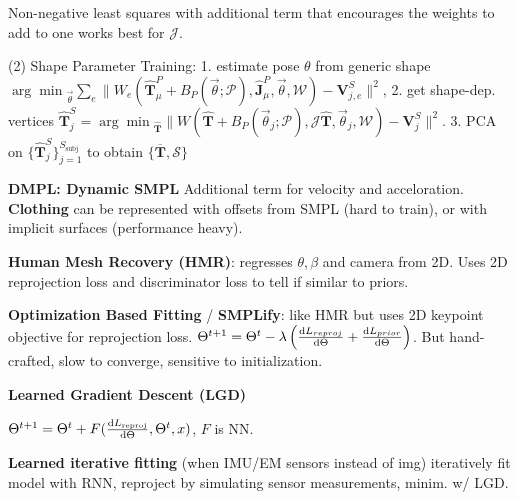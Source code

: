 Non-negative least squares with additional term that encourages the weights to add to one works best for \(\mathcal{J}\).

(2) Shape Parameter Training: 1. estimate pose \(\theta\) from generic shape \({\arg \min}_{{\vec{\theta}}} \sum_{e}\|W_{e}(\hat{\mathbf{T}}_{\mu}^{P}+B_{P}(\vec{\theta} ; \mathcal{P}), \hat{\mathbf{J}}_{\mu}^{P}, \vec{\theta}, \mathcal{W})-\mathbf{V}_{j, e}^{S}\|^{2}\),
2. get shape-dep. vertices \(\hat{\mathbf{T}}_{j}^{S}={\arg \min }_{\hat{\mathbf{T}}} \|W(\hat{\mathbf{T}}+B_{P}(\vec{\theta}_{j} ; \mathcal{P}), \mathcal{J} \hat{\mathbf{T}}, \vec{\theta}_{j}, \mathcal{W})-\mathbf{V}_{j}^{S}\|^{2}\).
3. PCA on \(\{\hat{\mathbf{T}}_{j}^{S}\}_{j=1}^{S_{\text {subj }}}\) to obtain \(\{\overline{\mathbf{T}}, \mathcal{S}\}\)

\textbf{DMPL: Dynamic SMPL} Additional term for velocity and acceloration. \textbf{Clothing} can be represented with offsets from SMPL (hard to train), or with implicit surfaces (performance heavy).

\textbf{Human Mesh Recovery (HMR)}: regresses $\theta, \beta$ and camera from 2D. Uses 2D reprojection loss and discriminator loss to tell if similar to priors.

\textbf{Optimization Based Fitting} / \textbf{SMPLify}: like HMR but uses 2D keypoint objective for reprojection loss. \(\Theta^{t+1} = \Theta^t - \lambda\left(\derivative{L_{reproj}}{\Theta} + \derivative{L_{prior}}{\Theta}\right)\). But hand-crafted, slow to converge, sensitive to initialization.

\textbf{Learned Gradient Descent (LGD)}

\(\Theta^{t+1}=\Theta^{t}+F(\derivative{L_{\text {reproj}}}{\Theta}, \Theta^{t}, x)\), \(F\) is NN.

\textbf{Learned iterative fitting} (when IMU/EM sensors instead of img) iteratively fit model with RNN, reproject by simulating sensor measurements, minim. w/ LGD.



